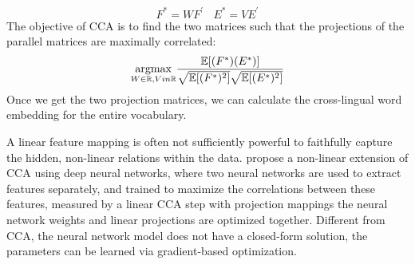 \[ {F}^{*} = W {F^{\prime}} \ \ \ \  {E}^{*} = V{E^{\prime}} \] 
The objective of CCA is to find the two matrices such that the projections of the parallel matrices are maximally correlated:
\[ \underset{W \in \mathbb{R}, V in \mathbb{R}}{\operatorname{argmax}} \frac{\mathbb{E}[({F}^{*})({E}^{*})]}{\sqrt{\mathbb{E}[({F}^{*})^2]} \sqrt{\mathbb{E}[({E}^{*})^2]}} \]
Once we get the two projection matrices, we can calculate the cross-lingual word embedding for the entire vocabulary.

A linear feature mapping is often not sufficiently powerful to faithfully capture the hidden, non-linear relations within the data. \cite{lu2015deep} propose a non-linear extension of CCA using deep neural networks, where two neural networks are used to extract features separately, and trained to maximize the correlations between these features, measured by a linear CCA step with projection mappings the neural network weights and linear projections are optimized together. Different from CCA, the neural network model does not have a closed-form solution, the parameters can be learned via gradient-based optimization.
\[ \]


